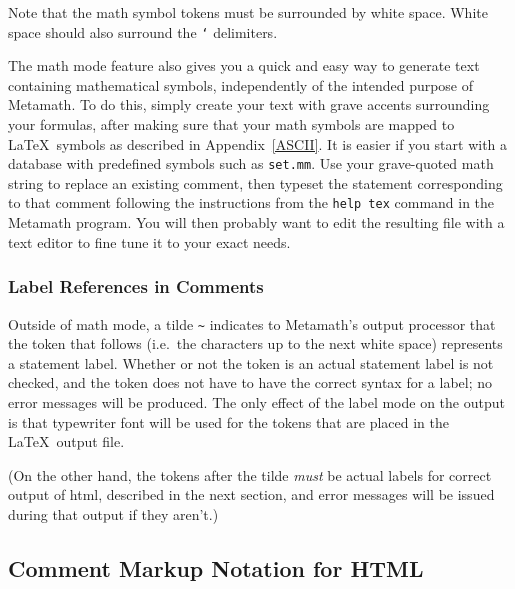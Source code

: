 Note that the math symbol tokens must be surrounded by white
space.
White space should also surround the \texttt{`}
delimiters.

The math mode feature also gives you a quick and easy way to generate
text containing mathematical symbols, independently of the intended
purpose of Metamath. To do this,
simply create your text with grave accents surrounding your formulas,
after making sure that your math symbols are mapped to \LaTeX\ symbols
as described in Appendix~\ref{ASCII}.  It is easier if you start with a
database with predefined symbols such as \texttt{set.mm}.  Use your
grave-quoted math string to replace an existing comment, then typeset
the statement corresponding to that comment following the instructions
from the \texttt{help tex} command in the Metamath program.  You will
then probably want to edit the resulting file with a text editor to fine
tune it to your exact needs.

\subsubsection{Label References in Comments}

Outside of math mode, a tilde \verb/~/
indicates to Metamath's output processor that the
token that follows (i.e.\ the characters up to the next
white space) represents a statement label.  Whether
or not the token is an actual statement label is not checked, and the
token does not have to have the correct syntax for a label; no error
messages will be produced.  The only effect of the label mode on the
output is that typewriter font will be used for the tokens that are
placed in the \LaTeX\ output file.

(On the other hand, the tokens after the tilde {\em must} be actual
labels for correct output of {\sc html}, described in the next section,
and error messages will be issued during that output if they aren't.)

\subsection{Comment Markup Notation for HTML}\label{htmlmkup}

